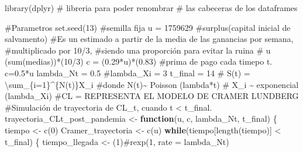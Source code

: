 \documentclass[
  us-letterpaper,
]{scrreprt}
\newenvironment{Shaded}{\begin{snugshade}}{\end{snugshade}}
\newcommand{\CommentTok}[1]{\textcolor[rgb]{0.37,0.37,0.37}{#1}}
\newcommand{\ControlFlowTok}[1]{\textcolor[rgb]{0.00,0.23,0.31}{\textbf{#1}}}
\newcommand{\DecValTok}[1]{\textcolor[rgb]{0.68,0.00,0.00}{#1}}
\newcommand{\FloatTok}[1]{\textcolor[rgb]{0.68,0.00,0.00}{#1}}
\newcommand{\FunctionTok}[1]{\textcolor[rgb]{0.28,0.35,0.67}{#1}}
\newcommand{\NormalTok}[1]{\textcolor[rgb]{0.00,0.23,0.31}{#1}}
\newcommand{\OtherTok}[1]{\textcolor[rgb]{0.00,0.23,0.31}{#1}}
\newcommand{\SpecialCharTok}[1]{\textcolor[rgb]{0.37,0.37,0.37}{#1}}
\theoremstyle{definition}
\theoremstyle{plain}
\theoremstyle{plain}
\theoremstyle{remark}
\begin{document}
\begin{Shaded}
\begin{Highlighting}[]
\FunctionTok{library}\NormalTok{(dplyr) }\CommentTok{\# libreria para poder renombrar }
\CommentTok{\# las cabeceras de los dataframes}

\CommentTok{\#Parametros}
\FunctionTok{set.seed}\NormalTok{(}\DecValTok{13}\NormalTok{) }\CommentTok{\#semilla fija}
\NormalTok{u }\OtherTok{=} \DecValTok{1759629} \CommentTok{\#surplus(capital inicial de salvamento)}
\CommentTok{\#Es un estimado a partir de la media de las ganancias por semana, }
\CommentTok{\#multiplicado por 10/3, }
\CommentTok{\#siendo una proporción para evitar la ruina}
\CommentTok{\# u (sum(medias))*(10/3)}
\NormalTok{c }\OtherTok{=}\NormalTok{ (}\FloatTok{0.29}\SpecialCharTok{*}\NormalTok{u)}\SpecialCharTok{*}\NormalTok{(}\FloatTok{0.83}\NormalTok{) }\CommentTok{\#prima de pago cada timepo t. c=0.5*u}
\NormalTok{lambda\_Nt }\OtherTok{=} \FloatTok{0.5}
\CommentTok{\#lambda\_Xi = 3}
\NormalTok{t\_final }\OtherTok{=} \DecValTok{14}
\CommentTok{\# S(t) = \textbackslash{}sum\_\{i=1\}\^{}\{N(t)\}X\_i}
\CommentTok{\#donde N(t)\textasciitilde{} Poisson (lambda*t)}
\CommentTok{\# X\_i \textasciitilde{} exponencial (lambda\_Xi)}
\CommentTok{\#CL = REPRESENTA EL MODELO DE CRAMER LUNDBERG}
\CommentTok{\#Simulación de trayectoria de CL\_t, cuando t \textless{} t\_final.}
\NormalTok{trayectoria\_CLt\_post\_pandemia }\OtherTok{\textless{}{-}} \ControlFlowTok{function}\NormalTok{(u, c, lambda\_Nt, t\_final)}
\NormalTok{\{}
\NormalTok{  tiempo }\OtherTok{\textless{}{-}} \FunctionTok{c}\NormalTok{(}\DecValTok{0}\NormalTok{)}
\NormalTok{  Cramer\_trayectoria }\OtherTok{\textless{}{-}} \FunctionTok{c}\NormalTok{(u)}
  \ControlFlowTok{while}\NormalTok{(tiempo[}\FunctionTok{length}\NormalTok{(tiempo)] }\SpecialCharTok{\textless{}}\NormalTok{ t\_final)}
\NormalTok{  \{}
\NormalTok{    tiempo\_llegada }\OtherTok{\textless{}{-}}\NormalTok{ (}\DecValTok{1}\NormalTok{)}\CommentTok{\#rexp(1, rate = lambda\_Nt)}
    

\end{Highlighting}
\end{Shaded}
\end{document}
